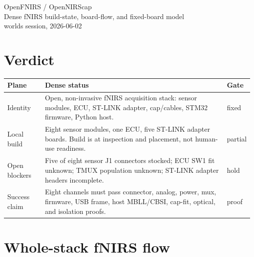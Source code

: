 \documentclass[10pt]{article}
\begin{document}
\begin{center}
{\Large OpenFNIRS / OpenNIRScap}\\
{\normalsize Dense fNIRS build-state, board-flow, and fixed-board model}\\
worlds session, 2026-06-02
\end{center}

\section*{Verdict}

\begin{center}\small
\begin{tabular}{|L{1.05in}|L{4.35in}|L{0.65in}|}
\hline
\textbf{Plane} & \textbf{Dense status} & \textbf{Gate} \\
\hline
Identity & Open, non-invasive fNIRS acquisition stack: sensor modules, ECU,
ST-LINK adapter, cap/cables, STM32 firmware, Python host. & fixed \\
\hline
Local build & Eight sensor modules, one ECU, five ST-LINK adapter boards. Build is
at inspection and placement, not human-use readiness. & partial \\
\hline
Open blockers & Five of eight sensor J1 connectors stocked; ECU SW1 fit unknown;
TMUX population unknown; ST-LINK adapter headers incomplete. & hold \\
\hline
Success claim & Eight channels must pass connector, analog, power, mux, firmware,
USB frame, host MBLL/CBSI, cap-fit, optical, and isolation proofs. & proof \\
\hline
\end{tabular}
\end{center}

\section{Whole-stack fNIRS flow}
\end{document}

